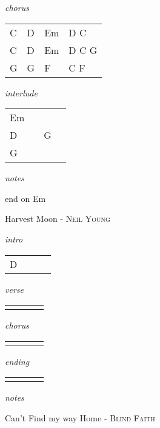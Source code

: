 \documentclass[12pt]{article}
\begin{document}
\textit{chorus}

\begin{tabular}{|P{1.25in}|P{1.25in}|P{1.25in}|P{1.25in}|}
  C & D  & Em  &  D C \\
  C & D  & Em  &  D C G \\
  G & G & F & C F \\
\end{tabular}

\textit{interlude}

\begin{tabular}{|P{1.25in}|P{1.25in}|P{1.25in}|P{1.25in}|}
  Em &   &   &   \\
  D &   & G  &   \\
  G &   &   &   \\
\end{tabular}

\textit{notes}

end on Em

\newpage


{\Huge Harvest Moon} {\huge - \textsc{Neil Young}}

\huge
\textit{intro}

\begin{tabular}{|P{1.25in}|P{1.25in}|P{1.25in}|P{1.25in}|}
  D &   &   &   \\
\end{tabular}

\textit{verse}

\begin{tabular}{|P{1.25in}|P{1.25in}|P{1.25in}|P{1.25in}|}
    &   &   &   \\
\end{tabular}

\textit{chorus}

\begin{tabular}{|P{1.25in}|P{1.25in}|P{1.25in}|P{1.25in}|}
    &   &   &   \\
\end{tabular}

\textit{ending}

\begin{tabular}{|P{1.25in}|P{1.25in}|P{1.25in}|P{1.25in}|}
    &   &   &   \\
\end{tabular}

\textit{notes}

\newpage

{\Huge Can't Find my way Home} {\huge - \textsc{Blind Faith}}
\end{document}
